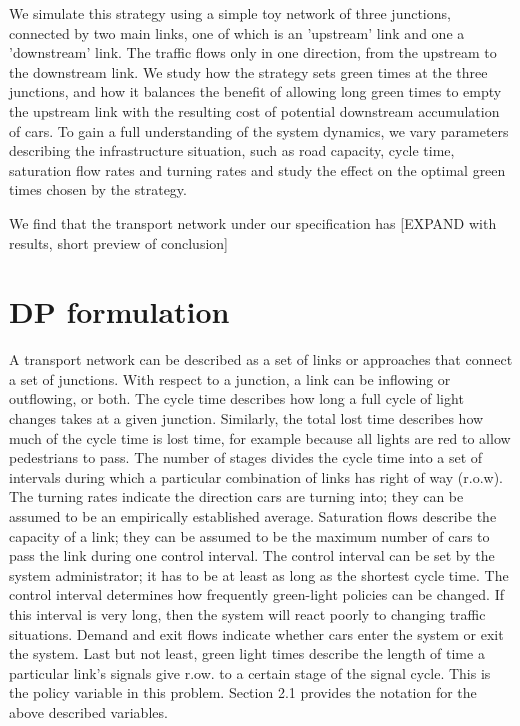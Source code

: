 \documentclass[11pt]{article}
\begin{document}
We simulate this strategy using a simple toy network of three junctions, connected by two main links, one of which is an 'upstream' link and one a 'downstream' link. The traffic flows only in one direction, from the upstream to the downstream link. We study how the strategy sets green times at the three junctions, and how it balances the benefit of allowing long green times to empty the upstream link with the resulting cost of potential downstream accumulation of cars. To gain a full understanding of the system dynamics, we vary parameters describing the infrastructure situation, such as road capacity, cycle time, saturation flow rates and turning rates and study the effect on the optimal green times chosen by the strategy.

We find that the transport network under our specification has [EXPAND with results, short preview of conclusion]

\section{DP formulation}
A transport network can be described as a set of links or approaches that connect a set of junctions. With respect to a junction, a link can be inflowing or outflowing, or both. The cycle time describes how long a full cycle of light changes takes at a given junction. Similarly, the total lost time describes how much of the cycle time is lost time, for example because all lights are red to allow pedestrians to pass. The number of stages divides the cycle time into a set of intervals during which a particular combination of links has right of way (r.o.w). The turning rates indicate the direction cars are turning into; they can be assumed to be an empirically established average. Saturation flows describe the capacity of a link; they can be assumed to be the maximum number of cars to pass the link during one control interval. The control interval can be set by the system administrator; it has to be at least as long as the shortest cycle time. The control interval determines how frequently green-light policies can be changed. If this interval is very long, then the system will react poorly to changing traffic situations. Demand and exit flows indicate whether cars enter the system or exit the system. Last but not least, green light times describe the length of time a particular link's signals give r.ow. to a certain stage of the signal cycle. This is the policy variable in this problem. Section 2.1 provides the notation for the above described variables.
\end{document}
